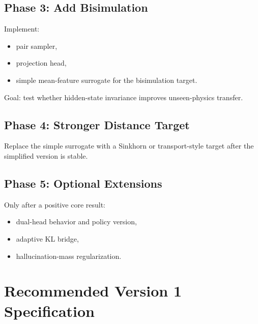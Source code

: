 \documentclass[11pt]{article}
\begin{document}
\subsection{Phase 3: Add Bisimulation}
Implement:
\begin{itemize}[leftmargin=1.5em]
    \item pair sampler,
    \item projection head,
    \item simple mean-feature surrogate for the bisimulation target.
\end{itemize}
Goal: test whether hidden-state invariance improves unseen-physics transfer.

\subsection{Phase 4: Stronger Distance Target}
Replace the simple surrogate with a Sinkhorn or transport-style target after the simplified version is stable.

\subsection{Phase 5: Optional Extensions}
Only after a positive core result:
\begin{itemize}[leftmargin=1.5em]
    \item dual-head behavior and policy version,
    \item adaptive KL bridge,
    \item hallucination-mass regularization.
\end{itemize}

\section{Recommended Version 1 Specification}
\end{document}
